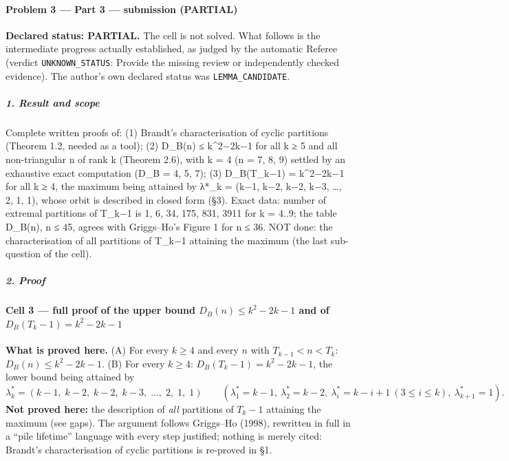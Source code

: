 \documentclass[11pt,a4paper]{article}
\begin{document}
\paragraph{Problem 3 --- Part 3 --- submission
(PARTIAL)}\label{problem-3-part-3-submission-partial}

\textbf{Declared status: PARTIAL.} The cell is not solved. What follows
is the intermediate progress actually established, as judged by the
automatic Referee (verdict \texttt{UNKNOWN\_STATUS}: Provide the missing
review or independently checked evidence). The author's own declared
status was \texttt{LEMMA\_CANDIDATE}.

\subparagraph{1. Result and scope}\label{result-and-scope}

Complete written proofs of: (1) Brandt's characterisation of cyclic
partitions (Theorem 1.2, needed as a tool); (2) D\_B(n) ≤ k\^{}2−2k−1
for all k ≥ 5 and all non-triangular n of rank k (Theorem 2.6), with k =
4 (n = 7, 8, 9) settled by an exhaustive exact computation (D\_B = 4, 5,
7); (3) D\_B(T\_k−1) = k\^{}2−2k−1 for all k ≥ 4, the maximum being
attained by λ*\_k = (k−1, k−2, k−2, k−3, \ldots, 2, 1, 1), whose orbit
is described in closed form (§3). Exact data: number of extremal
partitions of T\_k−1 is 1, 6, 34, 175, 831, 3911 for k = 4..9; the table
D\_B(n), n ≤ 45, agrees with Griggs--Ho's Figure 1 for n ≤ 36. NOT done:
the characterisation of all partitions of T\_k−1 attaining the maximum
(the last sub-question of the cell).

\subparagraph{2. Proof}\label{proof}

\paragraph{\texorpdfstring{Cell 3 --- full proof of the upper bound
\(D_B(n)\le k^2-2k-1\) and of
\(D_B(T_k-1)=k^2-2k-1\)}{Cell 3 --- full proof of the upper bound D\_B(n)\textbackslash le k\^{}2-2k-1 and of D\_B(T\_k-1)=k\^{}2-2k-1}}\label{cell-3-full-proof-of-the-upper-bound-d_bnle-k2-2k-1-and-of-d_bt_k-1k2-2k-1}

\textbf{What is proved here.} (A) For every \(k\ge 4\) and every \(n\)
with \(T_{k-1}<n<T_k\): \(D_B(n)\le k^2-2k-1\). (B) For every
\(k\ge 4\): \(D_B(T_k-1)=k^2-2k-1\), the lower bound being attained by
\[\lambda^*_k=(k-1,\;k-2,\;k-2,\;k-3,\;\dots,\;2,\;1,\;1)\qquad(\lambda^*_1=k-1,\ \lambda^*_2=k-2,\ \lambda^*_i=k-i+1\ (3\le i\le k),\ \lambda^*_{k+1}=1).\]
\textbf{Not proved here:} the description of \emph{all} partitions of
\(T_k-1\) attaining the maximum (see gaps). The argument follows
Griggs--Ho (1998), rewritten in full in a ``pile lifetime'' language
with every step justified; nothing is merely cited: Brandt's
characterisation of cyclic partitions is re-proved in §1.
\end{document}
